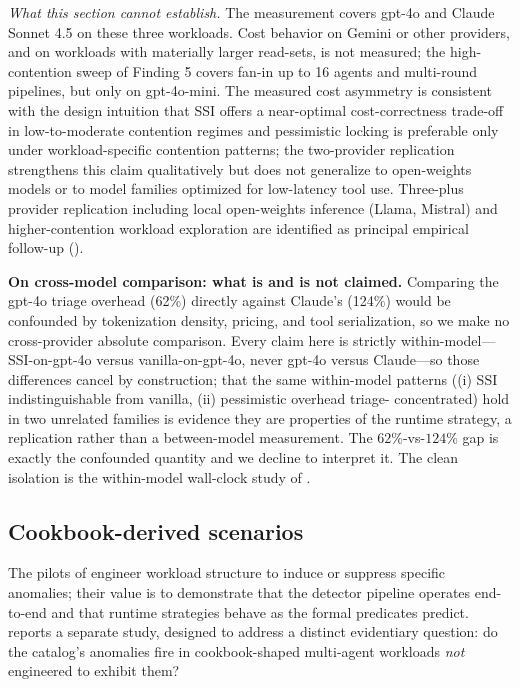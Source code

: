 \documentclass[journal,compsoc,10pt]{IEEEtran}
\theoremstyle{definition}
\theoremstyle{remark}
\begin{document}
\medskip
\noindent\textit{What this section cannot establish.}
The measurement covers gpt-4o and Claude Sonnet 4.5 on these
three workloads. Cost behavior on Gemini or other providers, and
on workloads with materially larger read-sets, is not measured;
the high-contention sweep of Finding 5 covers fan-in up to 16
agents and multi-round pipelines, but only on gpt-4o-mini. The measured cost asymmetry is consistent with the
design intuition that SSI offers a near-optimal cost-correctness
trade-off in low-to-moderate contention regimes and pessimistic
locking is preferable only under workload-specific contention
patterns; the two-provider replication strengthens this claim
qualitatively but does not generalize to open-weights models or
to model families optimized for low-latency tool use. Three-plus
provider replication including local open-weights inference
(Llama, Mistral) and higher-contention workload exploration are
identified as principal empirical follow-up
().

\medskip
\noindent\textbf{On cross-model comparison: what is and is not claimed.}
Comparing the gpt-4o triage overhead (62\%) directly against Claude's
(124\%) would be confounded by tokenization density, pricing, and tool
serialization, so we make no cross-provider absolute comparison. Every
claim here is strictly within-model---SSI-on-gpt-4o versus
vanilla-on-gpt-4o, never gpt-4o versus Claude---so those differences
cancel by construction; that the same within-model patterns ((i) SSI
indistinguishable from vanilla, (ii) pessimistic overhead triage-%
concentrated) hold in two unrelated families is evidence they are
properties of the runtime strategy, a replication rather than a
between-model measurement. The $62\%$-vs-$124\%$ gap is exactly the
confounded quantity and we decline to interpret it. The clean isolation is
the within-model wall-clock study of .

\subsection{Cookbook-derived scenarios}
\label{sec:cookbook}

The pilots of 
engineer workload structure to induce or suppress
specific anomalies; their value is to demonstrate that the
detector pipeline operates end-to-end and that runtime
strategies behave as the formal predicates predict.
 reports a separate study, designed to
address a distinct evidentiary question: do the catalog's
anomalies fire in cookbook-shaped multi-agent workloads
\emph{not} engineered to exhibit them?
\end{document}
